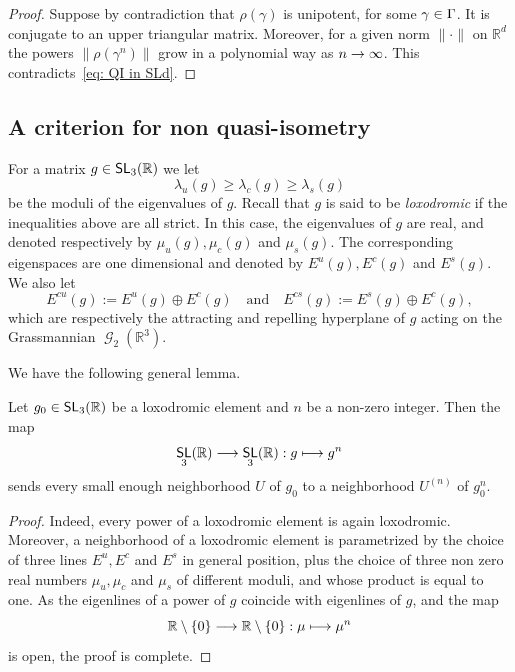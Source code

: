 \documentclass[AHL,Unicode,longabstracts]{cedram}
\DeclareMathOperator{\SL}{\mathsf{SL}}
\DeclareMathOperator{\Gr}{\mathcal{G}}
\newcommand{\R}{\mathbb{R}}
\newcommand{\RR}{\R}
\newcommand{\Es}{E^s}
\newcommand{\Ec}{E^c}
\newcommand{\Eu}{E^u}
\newcommand{\Ecs}{E^{cs}}
\newcommand{\Ecu}{E^{cu}}
\renewcommand*{\to}{\mathchoice{\longrightarrow}{\rightarrow}{\rightarrow}{\rightarrow}}
\let\oldmapsto\mapsto
\renewcommand*{\mapsto}{\mathchoice{\longmapsto}{\oldmapsto}{\oldmapsto}{\oldmapsto}}
\let\oldin\in
\renewcommand{\in}{\mathchoice{\oldin}{\oldin}{\,\oldin\,}{\,\oldin\,}}
\newcommand{\RR}{\mathbb{R}}
\begin{document}
\begin{proof}
Suppose by contradiction that $\rho(\gamma)$ is unipotent, for some $\gamma\in\Gamma$. It is conjugate to an upper triangular matrix. Moreover, for a given norm $\|\cdot\|$ on $\R^d$ the powers $\| \rho(\gamma^n)\|$ grow in a polynomial way as $n\to\infty$. This contradicts~\eqref{eq: QI in SLd}.
\end{proof}


\subsection{A criterion for non quasi-isometry}\label{ss.criterionnonQI}



For a matrix $g\in\SL_3(\R)$ we let
\[
\lambda_u(g)\geq\lambda_c(g)\geq\lambda_s(g)
\]
be the moduli of
the eigenvalues of $g$. Recall that $g$ is said to be \emph{loxodromic} if the inequalities above are all strict. In this case, the eigenvalues of $g$ are real, and denoted respectively by $\mu_u(g),\mu_c(g)$ and $\mu_s(g)$. The corresponding eigenspaces are one dimensional and denoted by $\Eu(g),\Ec(g)$
and $\Es(g)$. We also let
\[
\Ecu(g):=\Eu(g)\oplus\Ec(g) \quad\text{and}\quad
\Ecs(g):=\Es(g)\oplus\Ec(g),
\]
which are respectively the
attracting and repelling hyperplane of $g$ acting on the Grassmannian $\Gr_2(\R^3)$.

We have the following general lemma.


\begin{lemm}\label{lem: power map is open}
Let $g_0\in\SL_3(\RR)$ be a loxodromic element and $n$ be a non-zero integer.
Then the map
\[
\SL_3(\RR)\to \SL_3(\RR): g\mapsto g^n
\]
sends every small enough neighborhood $U$ of $g_0$ to a neighborhood $U^{(n)}$ of $g_0^n$.
\end{lemm}


\begin{proof}
Indeed, every power of a loxodromic element is again loxodromic. Moreover, a neighborhood of a loxodromic element is parametrized by the choice of three lines $\Eu,\Ec$ and $\Es$ in general position, plus the choice of three non zero real numbers $\mu_u,\mu_c$ and $\mu_s$ of different moduli, and whose product is equal to one. As the eigenlines of a power of $g$ coincide with
eigenlines of $g$, and the map
\[
\R\setminus\{0\}\to \R\setminus\{0\}:
\mu\mapsto \mu^n
\]
is open, the proof is complete.
\end{proof}
\end{document}
